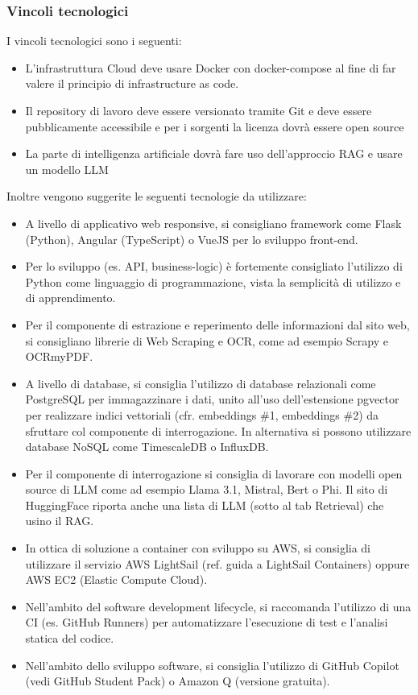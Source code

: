 \subsubsection{Vincoli tecnologici}
I vincoli tecnologici sono i seguenti:
\begin{itemize}
    \item L’infrastruttura Cloud deve usare Docker con docker-compose al fine di far valere il
    principio di infrastructure as code.
    \item Il repository di lavoro deve essere versionato tramite Git e deve essere pubblicamente
    accessibile e per i sorgenti la licenza dovrà essere open
    source
    \item La parte di intelligenza artificiale dovrà fare uso dell’approccio RAG e usare un modello LLM
\end{itemize}
Inoltre vengono suggerite le seguenti tecnologie da utilizzare:
\begin{itemize}
    \item A livello di applicativo web responsive, si consigliano framework come Flask (Python), Angular
    (TypeScript) o VueJS per lo sviluppo front-end.
    \item Per lo sviluppo (es. API, business-logic) è fortemente consigliato l’utilizzo di Python come
    linguaggio di programmazione, vista la semplicità di utilizzo e di apprendimento.
    \item Per il componente di estrazione e reperimento delle informazioni dal sito web, si consigliano
    librerie di Web Scraping e OCR, come ad esempio Scrapy e OCRmyPDF.
    \item A livello di database, si consiglia l’utilizzo di database relazionali come PostgreSQL per
    immagazzinare i dati, unito all’uso dell’estensione pgvector per realizzare indici vettoriali (cfr.
    embeddings \#1, embeddings \#2) da sfruttare col componente di interrogazione. In alternativa si
    possono utilizzare database NoSQL come TimescaleDB o InfluxDB.
    \item Per il componente di interrogazione si consiglia di lavorare con modelli open source di LLM come
    ad esempio Llama 3.1, Mistral, Bert o Phi. Il sito di HuggingFace riporta anche una lista di LLM
    (sotto al tab Retrieval) che usino il RAG.
    \item In ottica di soluzione a container con sviluppo su AWS, si consiglia di utilizzare il servizio AWS
    LightSail (ref. guida a LightSail Containers) oppure AWS EC2 (Elastic Compute Cloud).
    \item Nell’ambito del software development lifecycle, si raccomanda l’utilizzo di una CI (es. GitHub
    Runners) per automatizzare l’esecuzione di test e l’analisi statica del codice.
    \item Nell’ambito dello sviluppo software, si consiglia l’utilizzo di GitHub Copilot (vedi GitHub Student
    Pack) o Amazon Q (versione gratuita).
\end{itemize}

